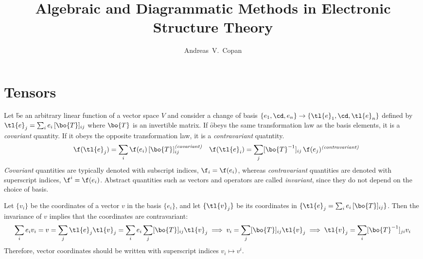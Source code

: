 \documentclass[11pt,fleqn]{article}
\makeatletter
\numberwithin{equation}{section}
\renewcommand\tableofcontents{%
  \@starttoc{toc}%
}
\makeatother
\begin{document}
\title{Algebraic and Diagrammatic Methods in Electronic Structure Theory}
\author{Andreas~V.~Copan}
\date{}

\maketitle
\tableofcontents

\section{Tensors}\label{sec-tensors}

\begin{dfn}
Let \f be an arbitrary linear function of a vector space $V$ and consider a change of basis $\{e_1,\cd,e_n\}\rightarrow\{\tl{e}_1,\cd,\tl{e}_n\}$ defined by $\tl{e}_j = \sum_ie_i\,[\bo{T}]_{ij}$ where $\bo{T}$ is an invertible matrix.
If \f obeys the same transformation law as the basis elements, it is a \textit{covariant} quantity.
If it obeys the opposite transformation law, it is a \textit{contravariant} quatntity.
\begin{align}
&&
  \f(\tl{e}_j)=\sum_i\f(e_i)\,[\bo{T}]_{ij}
\sp\text{\textit{(covariant)}}
&&
  \f(\tl{e}_i)=\sum_j[\bo{T}^{-1}]_{ij}\,\f(e_j)
\sp\text{\textit{(contravariant)}}
\end{align}
\textit{Covariant} quantities are typically denoted with subscript indices, $\f_i=\f(e_i)$, whereas \textit{contravariant} quantities are denoted with superscript indices, $\f^i=\f(e_i)$.
Abstract quantities such as vectors and operators are called \textit{invariant}, since they do not depend on the choice of basis.
\end{dfn}

\begin{ex}\label{vector-coordinates-are-contravariant}
Let $\{v_i\}$ be the coordinates of a vector $v$ in the basis $\{e_i\}$, and let $\{\tl{v}_j\}$ be its coordinates in $\{\tl{e}_j=\sum_ie_i\,[\bo{T}]_{ij}\}$.
Then the invariance of $v$ implies that the coordinates are contravariant:
\begin{align*}
  \sum_ie_iv_i=v=\sum_j\tl{e}_j\tl{v}_j
=
  \sum_ie_i\sum_j[\bo{T}]_{ij}\tl{v}_j
\implies
  v_i
=
  \sum_j[\bo{T}]_{ij}\tl{v}_j
\implies
  \tl{v}_j
=
  \sum_i[\bo{T}^{-1}]_{ji}v_i
\end{align*}
Therefore, vector coordinates should be written with superscript indices $v_i\mapsto v^i$.
\end{ex}
\end{document}
